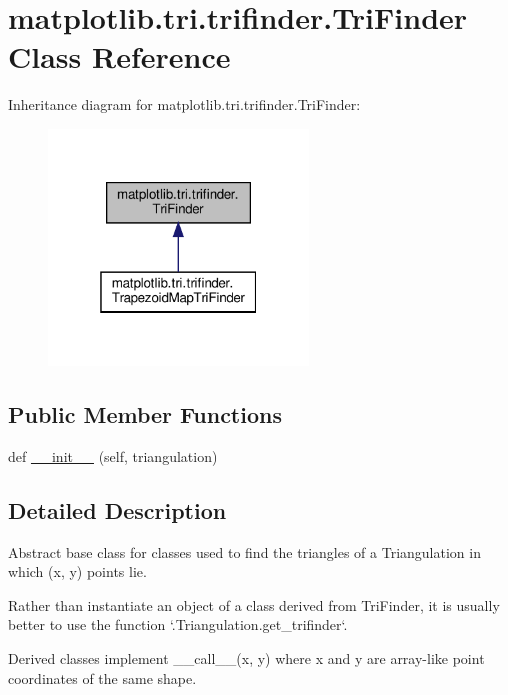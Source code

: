 \hypertarget{classmatplotlib_1_1tri_1_1trifinder_1_1TriFinder}{}\section{matplotlib.\+tri.\+trifinder.\+Tri\+Finder Class Reference}
\label{classmatplotlib_1_1tri_1_1trifinder_1_1TriFinder}


Inheritance diagram for matplotlib.\+tri.\+trifinder.\+Tri\+Finder\+:
\nopagebreak
\begin{figure}[H]
\begin{center}
\leavevmode
\includegraphics[width=196pt]{classmatplotlib_1_1tri_1_1trifinder_1_1TriFinder__inherit__graph}
\end{center}
\end{figure}
\subsection*{Public Member Functions}
\begin{DoxyCompactItemize}
\item 
def \hyperlink{classmatplotlib_1_1tri_1_1trifinder_1_1TriFinder_a736c07de7f4868563bfa218fa84d344f}{\+\_\+\+\_\+init\+\_\+\+\_\+} (self, triangulation)
\end{DoxyCompactItemize}


\subsection{Detailed Description}
\begin{DoxyVerb}Abstract base class for classes used to find the triangles of a
Triangulation in which (x, y) points lie.

Rather than instantiate an object of a class derived from TriFinder, it is
usually better to use the function `.Triangulation.get_trifinder`.

Derived classes implement __call__(x, y) where x and y are array-like point
coordinates of the same shape.
\end{DoxyVerb}
 

